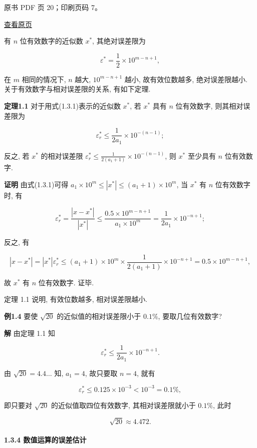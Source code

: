 \clearpage

原书 PDF 页 20；印刷页码 7。

\href{source-images/pdf-020.jpeg}{查看原页}

有 \(n\) 位有效数字的近似数 \(x^*\), 其绝对误差限为

\[
\varepsilon^* = \frac{1}{2} \times 10^{m-n+1},
\]

在 \(m\) 相同的情况下, \(n\) 越大, \(10^{m-n+1}\) 越小, 故有效位数越多, 绝对误差限越小. 关于有效数字与相对误差限的关系, 有如下定理.

\textbf{定理1.1} 对于用式(1.3.1)表示的近似数 \(x^*\), 若 \(x^*\) 具有 \(n\) 位有效数字, 则其相对误差限为

\[
\varepsilon_r^* \leqslant \frac{1}{2a_1} \times 10^{-(n-1)};
\]

反之, 若 \(x^*\) 的相对误差限 \(\varepsilon_r^* \leqslant \frac{1}{2(a_1+1)} \times 10^{-(n-1)}\), 则 \(x^*\) 至少具有 \(n\) 位有效数字.

\textbf{证明} 由式(1.3.1)可得 \(a_1 \times 10^m \leqslant |x^*| \leqslant (a_1+1) \times 10^m\), 当 \(x^*\) 有 \(n\) 位有效数字时, 有

\[
\varepsilon_r^* = \frac{|x-x^*|}{|x^*|} \leqslant \frac{0.5 \times 10^{m-n+1}}{a_1 \times 10^m} = \frac{1}{2a_1} \times 10^{-n+1};
\]

反之, 有

\[
|x-x^*| = |x^*| \varepsilon_r^* \leqslant (a_1+1) \times 10^m \times \frac{1}{2(a_1+1)} \times 10^{-n+1} = 0.5 \times 10^{m-n+1},
\]

故 \(x^*\) 有 \(n\) 位有效数字. 证毕.

定理 1.1 说明, 有效位数越多, 相对误差限越小.

\textbf{例1.4} 要使 \(\sqrt{20}\) 的近似值的相对误差限小于 \(0.1\%\), 要取几位有效数字?

\textbf{解} 由定理 1.1 知

\[
\varepsilon_r^* \leqslant \frac{1}{2a_1} \times 10^{-n+1}.
\]

由 \(\sqrt{20} = 4.4 \dots\) 知, \(a_1 = 4\), 故只要取 \(n=4\), 就有

\[
\varepsilon_r^* \leqslant 0.125 \times 10^{-3} < 10^{-3} = 0.1\%,
\]

即只要对 \(\sqrt{20}\) 的近似值取四位有效数字, 其相对误差限就小于 \(0.1\%\), 此时

\[
\sqrt{20} \approx 4.472.
\]

\paragraph{1.3.4 数值运算的误差估计}\label{ch01-ux6570ux503cux8fd0ux7b97ux7684ux8befux5deeux4f30ux8ba1}

